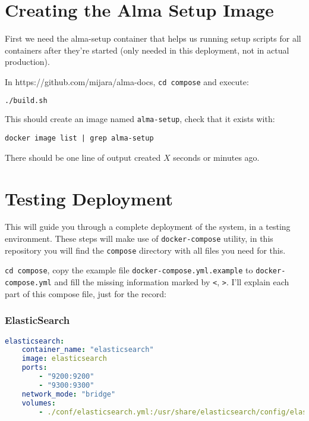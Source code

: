 \section{Creating the Alma Setup Image}

First we need the alma-setup container that helps us running setup scripts for all containers after they're started (only needed in this deployment, not in actual production).

In https://github.com/mijara/alma-docs, \texttt{cd compose} and execute:

\begin{lstlisting}[language=bash]
./build.sh
\end{lstlisting}

This should create an image named \texttt{alma-setup}, check that it exists with:

\begin{lstlisting}
docker image list | grep alma-setup
\end{lstlisting}

There should be one line of output created $X$ seconds or minutes ago.

\section{Testing Deployment}

This will guide you through a complete deployment of the system, in a testing environment. These steps will make use of \texttt{docker-compose} utility, in this repository you will find the \texttt{compose} directory with all files you need for this.

\texttt{cd compose}, copy the example file \texttt{docker-compose.yml.example} to \texttt{docker-compose.yml} and fill the missing information marked by \texttt{<}, \texttt{>}. I'll explain each part of this compose file, just for the record:

\subsubsection{ElasticSearch}

\begin{lstlisting}[language=yaml]
elasticsearch:
    container_name: "elasticsearch"
    image: elasticsearch
    ports:
        - "9200:9200"
        - "9300:9300"
    network_mode: "bridge"
    volumes:
        - ./conf/elasticsearch.yml:/usr/share/elasticsearch/config/elasticsearch.yml
\end{lstlisting}

